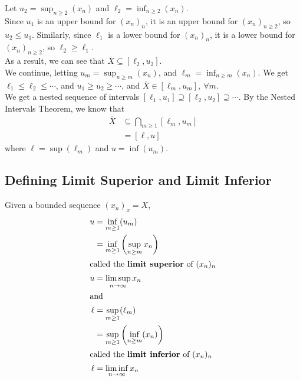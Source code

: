 \documentclass[10pt]{extarticle}
\begin{document}
    Let $u_2 = \sup_{n\geq 2}(x_n)$ and $\ell_2 = \inf_{n\geq 2}(x_n)$.\\

    Since $u_1$ is an upper bound for $(x_n)_{n}$, it is an upper bound for $(x_n)_{n\geq 2}$, so $u_2 \leq u_1$. Similarly, since $\ell_1$ is a lower bound for $(x_n)_n$, it is a lower bound for $(x_n)_{n\geq 2}$, so $\ell_2 \geq \ell_1$.\\

    As a result, we can see that $\overline{X} \subseteq [\ell_2,u_2]$.\\

    We continue, letting $u_m = \sup_{n\geq m}(x_n)$, and $\ell_m = \inf_{n\geq m}(x_n)$. We get $\ell_1 \leq \ell_2 \leq \cdots$, and $u_1 \geq u_2 \geq \cdots$, and $\overline{X} \in [\ell_m,u_m],~\forall m$.\\

    We get a nested sequence of intervals $[\ell_1,u_1]\supseteq [\ell_2,u_2]\supseteq \cdots$. By the Nested Intervals Theorem, we know that
    \begin{align*}
      \overline{X} &\subseteq \bigcap_{m\geq 1}[\ell_m,u_m]\\
                   &= [\ell,u]
    \end{align*}
    where $\ell = \sup(\ell_m)$ and $u = \inf(u_m)$.
    \subsection{Defining Limit Superior and Limit Inferior}%
      Given a bounded sequence $(x_n)_x = X$,
      \begin{align*}
        u &= \inf_{m\geq 1}(u_m)\\
          &= \inf_{m\geq 1}\left(\sup_{n\geq m}x_n\right)\\
          \shortintertext{called the \textbf{limit superior} of $(x_n)_n$}
        u &= \limsup_{n\rightarrow\infty}x_n\\
        \shortintertext{and}
        \ell &= \sup_{m\geq 1}(\ell_m)\\
             &= \sup_{m\geq 1}\left(\inf_{n\geq m}(x_n)\right)\\
             \shortintertext{called the \textbf{limit inferior} of $(x_n)_n$}
        \ell &= \liminf_{n\rightarrow\infty}x_n
      \end{align*}
\end{document}
